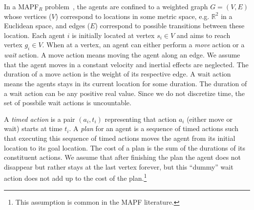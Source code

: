 \documentclass[letterpaper]{article} %
\newcommand\roni[1]{\nb{\textbf{Roni:}}{orange}{#1}}
\newcommand{\mapfr}{{MAPF}$_R$\xspace}
\begin{document}
In a \mapfr problem~\cite{walker2018extended}, the agents are confined to a weighted graph $G=(V, E)$ whose vertices ($V$) correspond to locations in some metric space, e.g. $\mathbb{R}^2$ in a Euclidean space, and edges ($E$) correspond to possible transitions between these location. 
Each agent $i$ is initially located at vertex $s_i\in V$ and aims to reach vertex $g_i\in V$. 
When at a vertex, an agent can either perform a \emph{move} action or a \emph{wait} action. 
A move action means moving the agent along an edge. 
We assume that the agent moves in a constant velocity and inertial effects are neglected. 
The duration of a move action is the weight of its respective edge. 
A wait action means the agents stays in its current location for some duration. 
The duration of a wait action can be any positive real value. Since we do not discretize time, the set of possbile wait actions is uncountable. 

A \emph{timed action} is a pair $(a_i, t_i)$ representing that action $a_i$ (either move or wait) starts at time $t_i$. 
A \emph{plan} for an agent is a sequence of timed actions such that executing this sequence of timed actions moves the agent from its initial location to its goal location. 
The cost of a plan is the sum of the durations of its constituent actions. 
We assume that after finishing the plan the agent does not disappear but rather stays at the last vertex forever, but this ``dummy'' wait action does not add up to the cost of the plan.\footnote{This assumption is common in the MAPF literature.}
\end{document}
